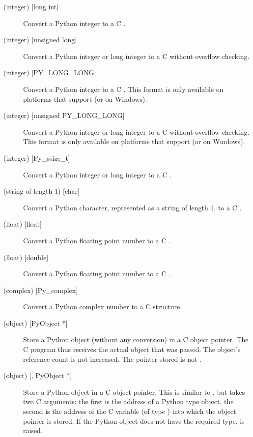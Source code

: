 \begin{description}
  \item[ (integer) {[long int]}]
  Convert a Python integer to a C .

  \item[ (integer) {[unsigned long]}]
  Convert a Python integer or long integer to a C  without
  overflow checking.  

  \item[ (integer) {[PY_LONG_LONG]}]
  Convert a Python integer to a C .  This format is
  only available on platforms that support  (or
   on Windows).

  \item[ (integer) {[unsigned PY_LONG_LONG]}]
  Convert a Python integer or long integer to a C 
  without overflow checking.  This format is only available on
  platforms that support  (or
   on Windows).  

  \item[ (integer) {[Py_ssize_t]}]
  Convert a Python integer or long integer to a C .

  \item[ (string of length 1) {[char]}]
  Convert a Python character, represented as a string of length 1, to
  a C .

  \item[ (float) {[float]}]
  Convert a Python floating point number to a C .

  \item[ (float) {[double]}]
  Convert a Python floating point number to a C .

  \item[ (complex) {[Py_complex]}]
  Convert a Python complex number to a C  structure.

  \item[ (object) {[PyObject *]}]
  Store a Python object (without any conversion) in a C object
  pointer.  The C program thus receives the actual object that was
  passed.  The object's reference count is not increased.  The pointer
  stored is not \NULL.

  \item[ (object) {[, PyObject *]}]
  Store a Python object in a C object pointer.  This is similar to
  , but takes two C arguments: the first is the address of a
  Python type object, the second is the address of the C variable (of
  type ) into which the object pointer is stored.  If
  the Python object does not have the required type,
   is raised.


\end{description}
